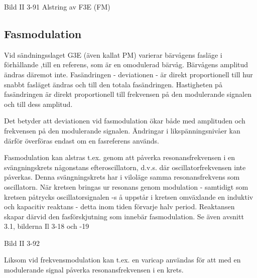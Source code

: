 Bild II 3-91 Alstring av F3E (FM)

\subsection{Fasmodulation}

Vid sändningsslaget G3E (även kallat PM) varierar bärvågens fasläge i
förhållande ,till en referens, som är en omodulerad bärvåg.  Bärvågens
amplitud ändras däremot inte.  Fasändringen - deviationen - är direkt
proportionell till hur snabbt fasläget ändras och till den totala
fasändringen. Hastigheten på fasändringen är direkt proportionell till
frekvensen på den modulerande signalen och till dess amplitud.

Det betyder att deviationen vid fasmodulation ökar både med amplituden
och frekvensen på den modulerande signalen. Ändringar i
likspänningsnivåer kan därför överföras endast om en fasreferens
används.

Fasmodulation kan alstras t.ex. genom att påverka resonansfrekvensen i
en svängningskrets någonstans efteroscillatorn, d.v.s.  där
oscillatorfrekvensen inte påverkas. Denna svängningskrets har i
viloläge samma resonansfrekvens som oscillatorn. När kretsen bringas
ur resonans genom modulation - samtidigt som kretsen påtrycks
oscillatorsignalen -s å uppstår i kretsen omväxlande en induktiv och
kapacitiv reaktans - detta inom tiden förvarje halv period. Reaktansen
skapar därvid den fasförskjutning som innebär fasmodulation. Se även
avsnitt 3.1, bilderna Il 3-18 och -19

Bild II 3-92

Liksom vid frekvensmodulation kan t.ex. en varicap användas för att
med en modulerande signal påverka resonansfrekvensen i en krets.

